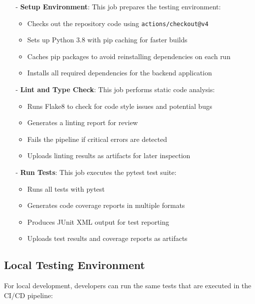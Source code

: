 \documentclass[12pt, titlepage]{article}
\begin{document}
\begin{itemize}
    \item[-] \textbf{Setup Environment}: This job prepares the testing environment:
    \begin{itemize}
        \item Checks out the repository code using \texttt{actions/checkout@v4}
        \item Sets up Python 3.8 with pip caching for faster builds
        \item Caches pip packages to avoid reinstalling dependencies on each run
        \item Installs all required dependencies for the backend application
    \end{itemize}
    
    \item[-] \textbf{Lint and Type Check}: This job performs static code analysis:
    \begin{itemize}
        \item Runs Flake8 to check for code style issues and potential bugs
        \item Generates a linting report for review
        \item Fails the pipeline if critical errors are detected
        \item Uploads linting results as artifacts for later inspection
    \end{itemize}
    
    \item[-] \textbf{Run Tests}: This job executes the pytest test suite:
    \begin{itemize}
        \item Runs all tests with pytest
        \item Generates code coverage reports in multiple formats
        \item Produces JUnit XML output for test reporting
        \item Uploads test results and coverage reports as artifacts
    \end{itemize}
\end{itemize}

\subsection{Local Testing Environment}

For local development, developers can run the same tests that are executed in the CI/CD pipeline:
\end{document}
